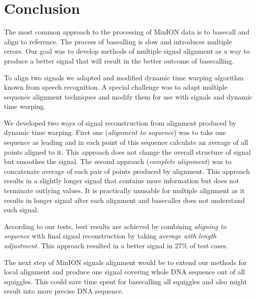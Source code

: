 \chapter*{Conclusion}  %

The most common approach to the processing of MinION data is to basecall and align to reference.
The process of basealling is slow and introduces multiple errors. Our goal
was to develop methods of multiple signal alignment as a way to produce a better signal that will
result in the better outcome of basecalling.

To align two signals we adapted and modified dynamic time warping algorithm known from speech recognition.
A special challenge was to adapt multiple sequence alignment techniques and modify them for use with signals and dynamic time warping.

We developed two ways of signal reconstruction from alignment produced by dynamic time warping. First one (\textit{alignment to sequence}) was to take one sequence as leading and in each point of this sequence calculate an average of all points aligned to it. This
approach does not change the overall structure of signal but smoothes the signal. 
The second approach (\textit{complete alignment}) was to concatenate average of each pair of points produced by alignment. This approach results in a slightly longer signal that contains more information but does not terminate outlying values. It is practically unusable for multiple alignment as it results in longer signal after each alignment and basecaller does not understand such signal.

According to our tests, best results are achieved by combining \textit{aligning to sequence} with final signal reconstruction by taking \textit{average with length adjustment}. This approach resulted in a better signal in $27\%$ of test cases.

The next step of MinION signals alignment would be to extend our methods for local alignment and produce one signal covering whole DNA sequence out of all squiggles. This could save time spent for basecalling all squiggles and also might result into more precise DNA sequence.